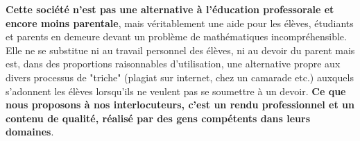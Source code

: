 \documentclass[a4paper,10pt]{article}
\begin{document}
\textbf{Cette société n'est pas une alternative à l'éducation professorale et encore moins parentale}, mais véritablement une aide pour les élèves, étudiants et parents en demeure devant un problème de mathématiques incompréhensible. Elle ne se substitue ni au travail personnel des élèves, ni au devoir du parent mais est, dans des proportions raisonnables d'utilisation, une alternative propre aux divers processus de "triche" (plagiat sur internet, chez un camarade etc.) auxquels s'adonnent les élèves lorsqu'ils ne veulent pas se soumettre à un devoir. \textbf{Ce que nous proposons à nos interlocuteurs, c'est un rendu professionnel et un contenu de qualité, réalisé par des gens compétents dans leurs domaines}.
\end{document}
